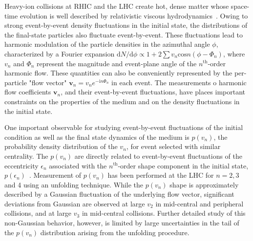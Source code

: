 Heavy-ion collisions at RHIC and the LHC create hot, dense matter whose space-time evolution is well described by relativistic viscous hydrodynamics~\cite{Gale:2013da, Heinz:2013th}. Owing to strong event-by-event density fluctuations in the initial state, the distributions of the final-state particles also fluctuate event-by-event. These fluctuations lead to harmonic modulation of the particle densities in the azimuthal angle $\phi$, characterized by a Fourier expansion $\text{d}N/\text{d}\phi\propto 1+2\sum v_n\text{cos}n(\phi-\Phi_n)$, where $v_n$ and $\Phi_n$ represent the magnitude and event-plane angle of the $n^\text{th}$-order harmonic flow. These quantities can also be conveniently represented by the per-particle "flow vector" $\pmb{v}_n=v_ne^{-\text{i}n\Phi_n}$ in each event. The measurements o harmonic flow coefficients $\pmb{v}_n$, and their event-by-event fluctuations, have places important constraints on the properties of the medium and on the density fluctuations in the initial state.

One important observable for studying event-by-event fluctuations of the initial condition as well as the final state dynamics of the medium is $p(v_n)$, the probability density distribution of the $v_n$, for event selected with similar centrality. The $p(v_n)$ are directly related to event-by-event fluctuations of the eccentricity $\epsilon_n$ associated with the $n^\text{th}$-order shape component in the initial state, $p(\epsilon_n)$~\cite{Gardim:2011xv, Gale:2012rq}. Measurement of $p(v_n)$ has been performed at the LHC for $n=2,3$ and 4 using an unfolding technique. While the $p(v_n)$ shape is approximately described by a Gaussian fluctuation of the underlying flow vector, significant deviations from Gaussian are observed at large $v_2$ in mid-central and peripheral collisions, and at large $v_3$ in mid-central collisions. Further detailed study of this non-Gaussian behavior, however, is limited by large uncertainties in the tail of the $p(v_n)$ distribution arising from the unfolding procedure.

